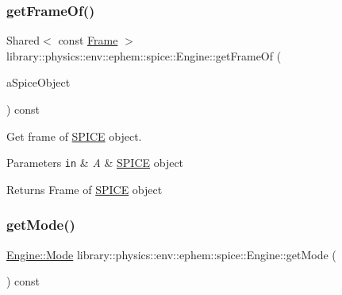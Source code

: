 \subsubsection{\texorpdfstring{get\+Frame\+Of()}{getFrameOf()}}
{\footnotesize\ttfamily Shared$<$ const \hyperlink{classlibrary_1_1physics_1_1coord_1_1_frame}{Frame} $>$ library\+::physics\+::env\+::ephem\+::spice\+::\+Engine\+::get\+Frame\+Of (\begin{DoxyParamCaption}\item[{const \hyperlink{classlibrary_1_1physics_1_1env_1_1ephem_1_1_s_p_i_c_e_a86f1a863677210ba8884807cc725c0f8}{S\+P\+I\+C\+E\+::\+Object} \&}]{a\+Spice\+Object }\end{DoxyParamCaption}) const}



Get frame of \hyperlink{classlibrary_1_1physics_1_1env_1_1ephem_1_1_s_p_i_c_e}{S\+P\+I\+CE} object. 


\begin{DoxyParams}[1]{Parameters}
\mbox{\tt in}  & {\em A} & \hyperlink{classlibrary_1_1physics_1_1env_1_1ephem_1_1_s_p_i_c_e}{S\+P\+I\+CE} object \\
\hline
\end{DoxyParams}
\begin{DoxyReturn}{Returns}
Frame of \hyperlink{classlibrary_1_1physics_1_1env_1_1ephem_1_1_s_p_i_c_e}{S\+P\+I\+CE} object 
\end{DoxyReturn}
\mbox{\label{classlibrary_1_1physics_1_1env_1_1ephem_1_1spice_1_1_engine_a50990662e08401c21b369365b332cd2e}} 
\subsubsection{\texorpdfstring{get\+Mode()}{getMode()}}
{\footnotesize\ttfamily \hyperlink{classlibrary_1_1physics_1_1env_1_1ephem_1_1spice_1_1_engine_a2d185a63bce354bff9ad38810410eab4}{Engine\+::\+Mode} library\+::physics\+::env\+::ephem\+::spice\+::\+Engine\+::get\+Mode (\begin{DoxyParamCaption}{ }\end{DoxyParamCaption}) const}



